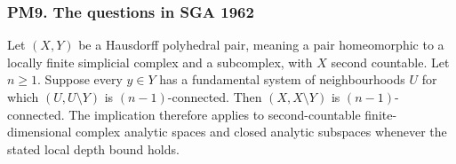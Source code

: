\subsubsection{PM9. The questions in SGA 1962}
\begin{theorem}\label{B:PM9}
Let $(X,Y)$ be a Hausdorff polyhedral pair, meaning a pair homeomorphic to a locally finite simplicial complex and a subcomplex, with $X$ second countable. Let $n\geq1$. Suppose every $y\in Y$ has a fundamental system of neighbourhoods $U$ for which $(U,U\setminus Y)$ is $(n-1)$-connected. Then $(X,X\setminus Y)$ is $(n-1)$-connected. The implication therefore applies to second-countable finite-dimensional complex analytic spaces and closed analytic subspaces whenever the stated local depth bound holds.
\end{theorem}
